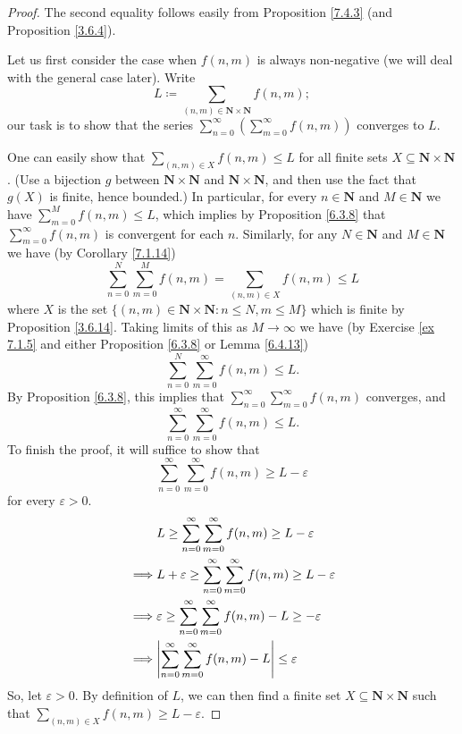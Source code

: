 \begin{proof}
The second equality follows easily from Proposition \ref{7.4.3} (and Proposition \ref{3.6.4}).

Let us first consider the case when \(f(n, m)\) is always non-negative (we will deal with the general case later).
Write
\[
    L \coloneqq \sum_{(n, m) \in \mathbf{N} \times \mathbf{N}} f(n, m);
\]
our task is to show that the series \(\sum_{n = 0}^\infty (\sum_{m = 0}^\infty f(n, m))\) converges to \(L\).

One can easily show that \(\sum_{(n, m) \in X} f(n, m) \leq L\) for all finite sets \(X \subseteq \mathbf{N} \times \mathbf{N}\).
(Use a bijection \(g\) between \(\mathbf{N} \times \mathbf{N}\) and \(\mathbf{N} \times \mathbf{N}\), and then use the fact that \(g(X)\) is finite, hence bounded.)
In particular, for every \(n \in \mathbf{N}\) and \(M \in \mathbf{N}\) we have \(\sum_{m = 0}^M f(n, m) \leq L\), which implies by Proposition \ref{6.3.8} that \(\sum_{m = 0}^\infty f(n, m)\) is convergent for each \(n\).
Similarly, for any \(N \in \mathbf{N}\) and \(M \in \mathbf{N}\) we have (by Corollary \ref{7.1.14})
\[
    \sum_{n = 0}^N \sum_{m = 0}^M f(n, m) = \sum_{(n, m) \in X} f(n, m) \leq L
\]
where \(X\) is the set \(\{(n,m) \in \mathbf{N} \times \mathbf{N} : n \leq N, m \leq M\}\) which is finite by Proposition \ref{3.6.14}.
Taking limits of this as \(M \to \infty\) we have (by Exercise \ref{ex 7.1.5} and either Proposition \ref{6.3.8} or Lemma \ref{6.4.13})
\[
    \sum_{n = 0}^N \sum_{m = 0}^\infty f(n, m) \leq L.
\]
By Proposition \ref{6.3.8}, this implies that \(\sum_{n = 0}^\infty \sum_{m = 0}^\infty f(n, m)\) converges, and
\[
    \sum_{n = 0}^\infty \sum_{m = 0}^\infty f(n, m) \leq L.
\]
To finish the proof, it will suffice to show that
\[
    \sum_{n = 0}^\infty \sum_{m = 0}^\infty f(n, m) \geq L - \varepsilon
\]
for every \(\varepsilon > 0\).
\begin{align*}
& L \geq \sum_{n = 0}^\infty \sum_{m = 0}^\infty f(n, m) \geq L - \varepsilon \\
\implies & L + \varepsilon \geq \sum_{n = 0}^\infty \sum_{m = 0}^\infty f(n, m) \geq L - \varepsilon \\
\implies & \varepsilon \geq \sum_{n = 0}^\infty \sum_{m = 0}^\infty f(n, m) - L \geq -\varepsilon \\
\implies & \abs*{\sum_{n = 0}^\infty \sum_{m = 0}^\infty f(n, m) - L} \leq \varepsilon \\
\end{align*}
So, let \(\varepsilon > 0\).
By definition of \(L\), we can then find a finite set \(X \subseteq \mathbf{N} \times \mathbf{N}\) such that \(\sum_{(n, m) \in X} f(n, m) \geq L - \varepsilon\).

\end{proof}
